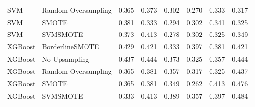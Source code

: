\begin{tabular}{llllllll}
                         SVM & Random Oversampling &     0.365 &                     0.373 &                 0.302 &                  0.270 &                                   0.333 &    0.317 \\
                         SVM &               SMOTE &     0.381 &                     0.333 &                 0.294 &                  0.302 &                                   0.341 &    0.325 \\
                         SVM &            SVMSMOTE &     0.373 &                     0.413 &                 0.278 &                  0.302 &                                   0.325 &    0.349 \\
                     XGBoost &     BorderlineSMOTE &     0.429 &                     0.421 &                 0.333 &                  0.397 &                                   0.381 &    0.421 \\
                     XGBoost &       No Upsampling &     0.437 &                     0.444 &                 0.373 &                  0.325 &                                   0.357 &    0.444 \\
                     XGBoost & Random Oversampling &     0.365 &                     0.381 &                 0.357 &                  0.317 &                                   0.325 &    0.437 \\
                     XGBoost &               SMOTE &     0.365 &                     0.381 &                 0.349 &                  0.262 &                                   0.413 &    0.476 \\
                     XGBoost &            SVMSMOTE &     0.333 &                     0.413 &                 0.389 &                  0.357 &                                   0.397 &    0.484 \\
\bottomrule
\end{tabular}
